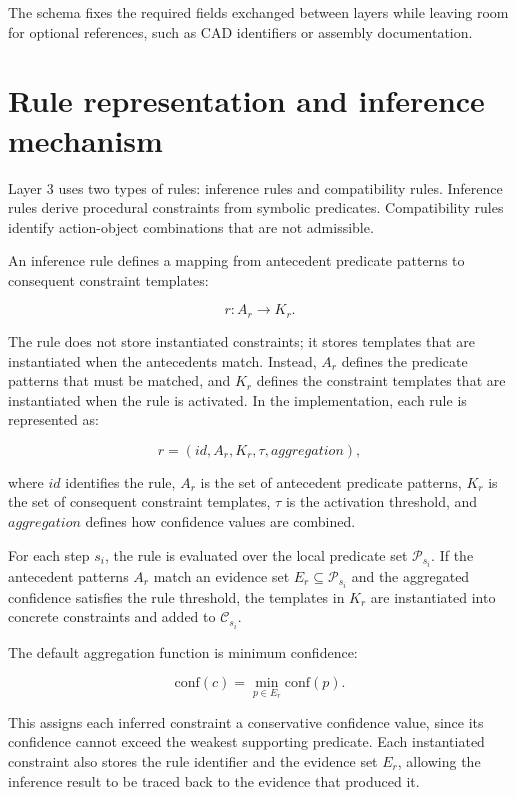 The schema fixes the required fields exchanged between layers while leaving room for optional references, such as CAD identifiers or assembly documentation.


\section{Rule representation and inference mechanism}
\label{sec:rule-representation}

Layer 3 uses two types of rules: inference rules and compatibility rules. Inference rules derive procedural constraints from symbolic predicates. Compatibility rules identify action-object combinations that are not admissible.

An inference rule defines a mapping from antecedent predicate patterns to consequent constraint templates:

\[
r: A_r \rightarrow K_r.
\]

The rule does not store instantiated constraints; it stores templates that are instantiated when the antecedents match. Instead, $A_r$ defines the predicate patterns that must be matched, and $K_r$ defines the constraint templates that are instantiated when the rule is activated. In the implementation, each rule is represented as:

\[
r = (id, A_r, K_r, \tau, aggregation),
\]

where $id$ identifies the rule, $A_r$ is the set of antecedent predicate patterns, $K_r$ is the set of consequent constraint templates, $\tau$ is the activation threshold, and $aggregation$ defines how confidence values are combined.

For each step $s_i$, the rule is evaluated over the local predicate set $\mathcal{P}_{s_i}$. If the antecedent patterns $A_r$ match an evidence set $E_r \subseteq \mathcal{P}_{s_i}$ and the aggregated confidence satisfies the rule threshold, the templates in $K_r$ are instantiated into concrete constraints and added to $\mathcal{C}_{s_i}$.

 

The default aggregation function is minimum confidence:

\[
\text{conf}(c) = \min_{p \in E_r} \text{conf}(p).
\]

This assigns each inferred constraint a conservative confidence value, since its confidence cannot exceed the weakest supporting predicate. Each instantiated constraint also stores the rule identifier and the evidence set $E_r$, allowing the inference result to be traced back to the evidence that produced it.

